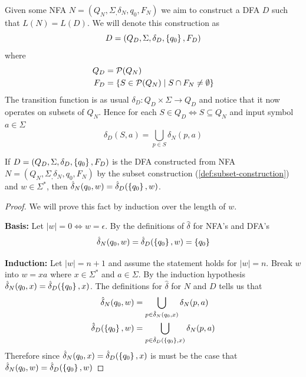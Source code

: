 \begin{definition}  \label{def:subset-construction}
    Given some NFA $N = (Q_N, \Sigma_, \delta_N, q_0, F_N)$ we aim to construct a DFA $D$ such that $L(N) = L(D)$. We will denote this construction as 
    $$D = (Q_D, \Sigma, \delta_D, \left\{ q_0 \right\}, F_D)$$
    where 
    \begin{align*}
        Q_D &= \mathcal{P}(Q_N) \\
        F_D &= \left\{ S\in\mathcal{P}(Q_N) \mid S\cap F_N \neq \emptyset \right\}
    \end{align*}
    The transition function is as usual $\delta_D : Q_D\times \Sigma \rightarrow Q_D$ and notice that it now operates on subsets of $Q_N$. Hence for each $S\in Q_D \Leftrightarrow S \subseteq Q_N$ and input symbol $a\in \Sigma$
    $$\delta_D(S, a) = \bigcup_{p\in S} \delta_N(p,a)$$
\end{definition}

\begin{lemma} \label{lem:equal-nfa-dfa-transitions}
    If $D = (Q_D, \Sigma, \delta_D, \left\{ q_0 \right\}, F_D)$ is the DFA constructed from NFA $N = (Q_N, \Sigma_, \delta_N, q_0, F_N)$ by the subset construction (\ref{def:subset-construction}) and $w \in \Sigma^*$, then $\hat\delta_N(q_0, w) = \hat\delta_D(\left\{ q_0 \right\}, w)$. 
\end{lemma}

\begin{proof}
    We will prove this fact by induction over the length of $w$.

    \textbf{Basis:} Let $|w| = 0 \Leftrightarrow w = \epsilon$. By the definitions of $\hat\delta$ for NFA's and DFA's $$\hat\delta_N(q_0, w) = \hat\delta_D(\left\{ q_0 \right\}, w) = \left\{ q_0 \right\}$$

    \textbf{Induction:} Let $|w| = n + 1$ and assume the statement holds for $|w| = n$. Break $w$ into $w = xa$ where $x \in \Sigma^*$ and $a \in \Sigma$. By the induction hypothesis $\hat\delta_N(q_0, x) = \hat\delta_D(\left\{ q_0 \right\}, x)$. The definitions for $\hat\delta$ for $N$ and $D$ tells us that 
    \begin{align*}
        \hat\delta_N(q_0, w) &= \bigcup_{p\in \hat\delta_N(q_0, x)} \delta_N(p, a) \\
        \hat\delta_D(\left\{ q_0 \right\}, w) &= \bigcup_{p\in \hat\delta_D(\left\{ q_0 \right\}, x)} \delta_N(p, a)
    \end{align*}
    Therefore since $\hat\delta_N(q_0, x) = \hat\delta_D(\left\{ q_0 \right\}, x)$ is must be the case that $\hat\delta_N(q_0, w) = \hat\delta_D(\left\{ q_0 \right\}, w)$
\end{proof}

